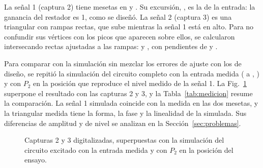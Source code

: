 La señal 1 (captura 2) tiene mesetas en  y . Su excursión, , es la de la entrada: la ganancia del restador es 1, como se diseñó. La señal 2 (captura 3) es una triangular con rampas rectas, que sube mientras la señal 1 está en alto. Para no confundir sus vértices con los picos que aparecen sobre ellos, se calcularon intersecando rectas ajustadas a las rampas:  y , con pendientes de  y .

Para comparar con la simulación sin mezclar los errores de ajuste con los de diseño, se repitió la simulación del circuito completo con la entrada medida ( a , ) y con $P_2$ en la posición que reproduce el nivel medido de la señal 1. La Fig.~\ref{fig:medsim} superpone el resultado con las capturas 2 y 3, y la Tabla~\ref{tab:medicion} resume la comparación. La señal 1 simulada coincide con la medida en las dos mesetas, y la triangular medida tiene la forma, la fase y la linealidad de la simulada. Sus diferencias de amplitud y de nivel se analizan en la Sección~\ref{sec:problemas}.

\begin{figure}[!htb]
\centering
{}
\caption{Capturas 2 y 3 digitalizadas, superpuestas con la simulación del circuito excitado con la entrada medida y con $P_2$ en la posición del ensayo.}
\label{fig:medsim}
\end{figure}

